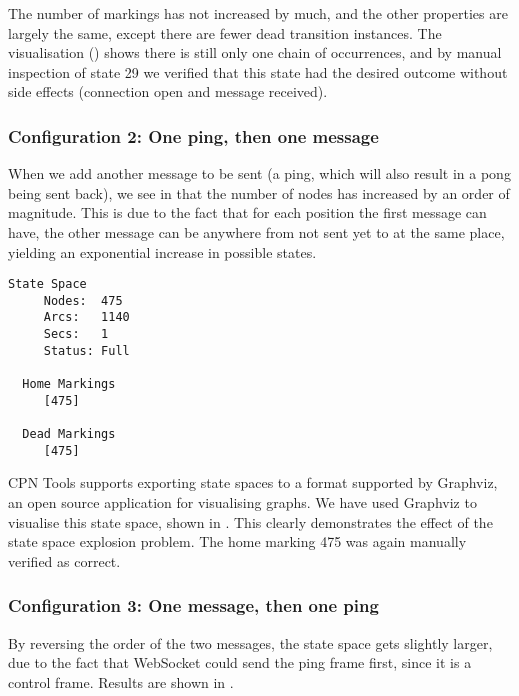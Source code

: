 	The number of markings has not increased by much, and the other properties are
	largely the same, except there are fewer dead transition instances. 
	The visualisation () shows there is still only one
	chain of occurrences, and by manual inspection of state 29 we verified that
	this state had the desired outcome without side effects (connection open and
	message received).
	
	\subsubsection{Configuration 2: One ping, then one message}
	When we add another message to be sent (a ping, which will also result in a
	pong being sent back), we see in  that the number of nodes
	has increased by an order of magnitude. This is due to the fact that for each
	position the first message can have, the other message can be
	anywhere from not sent yet to at the same place, yielding an exponential
	increase in possible states.
	
	\begin{lstlisting}[language={},float,label=lst:ssa_ping_msg,caption=One ping
	then one message] State Space
     Nodes:  475
     Arcs:   1140
     Secs:   1
     Status: Full
     
  Home Markings
     [475]

  Dead Markings
     [475]
	\end{lstlisting}
	
	CPN Tools supports exporting state spaces to a format supported by Graphviz, an
	open source application for visualising graphs. We have used Graphviz to
	visualise this state space, shown in . This
	clearly demonstrates the effect of the state space explosion problem. 
		The home marking 475 was again manually verified as correct.
	

	\subsubsection{Configuration 3: One message, then one ping}
	By reversing the order of the two messages, the state space gets slightly
	larger, due to the fact that WebSocket could send the ping frame first, since
	it is a control frame. Results are shown in .
	
